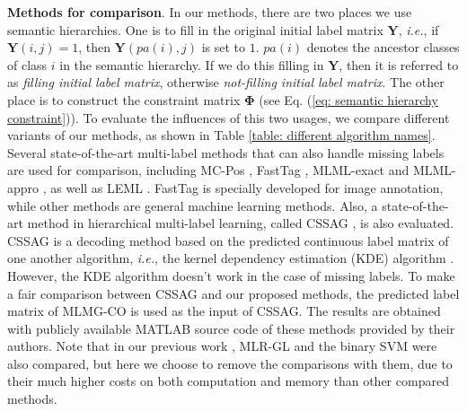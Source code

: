 \documentclass[twocolumn]{svjour3}          %
\newcommand{\B}{\mathbf{B}}
\newcommand{\Y}{\mathbf{Y}}
\begin{document}
\vspace{4pt}\noindent\textbf{Methods for comparison}. 
In our methods, there are two places we use semantic hierarchies. One is to fill in the original initial label matrix $\Y$, {\it i.e.}, if $\Y(i, j) = 1$, then $\Y(pa(i), j)$ is set to $1$. $pa(i)$ denotes the ancestor classes of class $i$ in the semantic hierarchy. 
If we do this filling in $\Y$, then it is referred to as {\it filling initial label matrix}, otherwise {\it not-filling initial label matrix}. 
The other place is to construct the constraint matrix $\mathbf{\Phi}$ (see Eq. (\ref{eq: semantic hierarchy constraint})). To evaluate the influences of this two usages, we compare different variants of our methods, as shown in Table \ref{table: different algorithm names}. 
%
Several state-of-the-art multi-label methods that can also handle missing labels are used for comparison, including %
MC-Pos \cite{MC-Pos-nips-2011}, FastTag \cite{fasttag-icml-2013}, MLML-exact and MLML-appro \cite{my-icpr-2014}, as well as LEML \cite{LEML-ICML-2014}. %
FastTag is specially developed for image annotation, while other methods are general machine learning methods.
Also, a state-of-the-art method in hierarchical multi-label learning, called CSSAG \cite{bi-wei-icml-2011}, is also evaluated. CSSAG is a decoding method based on the predicted continuous label matrix of one another algorithm, {\it i.e.}, the kernel dependency estimation (KDE) algorithm \cite{kde-nips-2002}. However, the KDE algorithm doesn't work in the case of missing labels.
To make a fair comparison between CSSAG and our proposed methods,
the predicted label matrix of MLMG-CO is used as the input of CSSAG. The results are obtained with publicly available MATLAB source code of these methods provided by their authors.
%
Note that in our previous work \cite{my-iccv-2015}, MLR-GL \cite{bucak-multi-incomplete-2011} and the binary SVM were also compared, but here we choose to remove the comparisons with them, due to their much higher costs on both computation and memory than other compared methods. 
\end{document}
